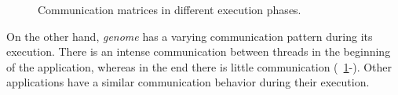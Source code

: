 \begin{figure}[!t]
{	}
	\caption{Communication matrices in different execution phases.}
	\label{fig:DynamicMatrices}
\end{figure}
On the other hand, \emph{genome} has a varying communication pattern during its execution. There is an intense communication between threads in the beginning of the application, whereas in the end there is little communication (\figurename~\ref{fig:DynamicMatrices}-). Other applications have a similar communication behavior during their execution.

